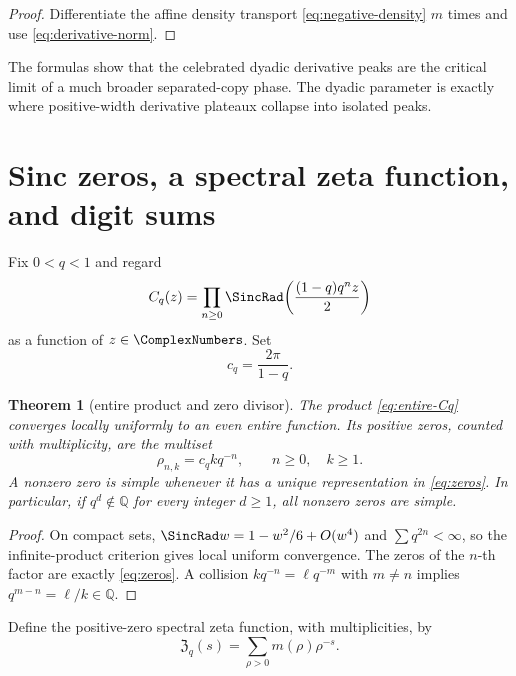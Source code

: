 \documentclass[11pt]{article}
\newtheorem{theorem}{Theorem}[section]
\theoremstyle{definition}
\theoremstyle{remark}
\begin{document}
\begin{proof}
Differentiate the affine density transport \cref{eq:negative-density} $m$ times and use \cref{eq:derivative-norm}.
\end{proof}

The formulas show that the celebrated dyadic derivative peaks are the critical limit of a much broader separated-copy phase.  The dyadic parameter is exactly where positive-width derivative plateaux collapse into isolated peaks.

\section{Sinc zeros, a spectral zeta function, and digit sums}
\label{sec:spectral}

Fix $0<q<1$ and regard
\begin{equation}\label{eq:entire-Cq}
 C_q(z)=\prod_{n\ge0}\SincRad\!\left(\frac{(1-q)q^nz}{2}\right)
\end{equation}
as a function of $z\in\ComplexNumbers$.  Set
\begin{equation}\label{eq:cq}
 c_q=\frac{2\pi}{1-q}.
\end{equation}

\begin{theorem}[entire product and zero divisor]\label{thm:zero-divisor}
The product \cref{eq:entire-Cq} converges locally uniformly to an even entire function.  Its positive zeros, counted with multiplicity, are the multiset
\begin{equation}\label{eq:zeros}
 \rho_{n,k}=c_qkq^{-n},
 \qquad n\ge0,\quad k\ge1.
\end{equation}
A nonzero zero is simple whenever it has a unique representation in \cref{eq:zeros}.  In particular, if $q^d\notin\mathbb Q$ for every integer $d\ge1$, all nonzero zeros are simple.
\end{theorem}

\begin{proof}
On compact sets, $\SincRad w=1-w^2/6+O(w^4)$ and $\sum q^{2n}<\infty$, so the infinite-product criterion gives local uniform convergence.  The zeros of the $n$-th factor are exactly \cref{eq:zeros}.  A collision
$kq^{-n}=\ell q^{-m}$ with $m\ne n$ implies $q^{m-n}=\ell/k\in\mathbb Q$.
\end{proof}

Define the positive-zero spectral zeta function, with multiplicities, by
\begin{equation}\label{eq:spectral-zeta-def}
 \mathfrak Z_q(s)=\sum_{\rho>0}m(\rho)\rho^{-s}.
\end{equation}
\end{document}
